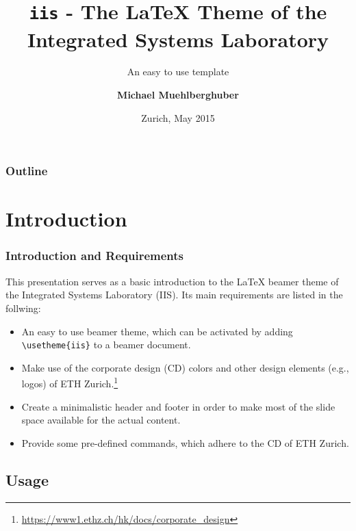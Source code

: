 \documentclass{beamer}
\title{\textbf{\texttt{iis}} - The \LaTeX{} \latexcls{beamer} Theme of the Integrated Systems Laboratory}
\subtitle{An easy to use template}
\date{Zurich, May 2015}
\author[%
  M. Muehlberghuber%
]{%
  \textbf{Michael Muehlberghuber}%
}
\institute[%
  IIS%
]{Integrated Systems Laboratory}
\newcommand\latexcls[1]{\textsf{#1}}
\begin{document}
\begin{frame}
\titlepage
\end{frame}

\begin{frame}
\frametitle{Outline}
\tableofcontents
\end{frame}

\section{Introduction}

\begin{frame}[%
  fragile %
]
\frametitle{Introduction and Requirements}
%
This presentation serves as a basic introduction to the \LaTeX{}
\latexcls{beamer} theme of the Integrated Systems Laboratory
(IIS). Its main requirements are listed in the follwing: \vfill
%
  \begin{itemize}
  \item An easy to use \latexcls{beamer} theme, which can be activated
    by adding \lstinline[style=latexcodestyle]!\usetheme{iis}! to a
    \latexcls{beamer} document. \vfill
  \item Make use of the corporate design (CD) colors and other design
    elements (e.g., logos) of ETH
    Zurich.\footnote{\url{https://www1.ethz.ch/hk/docs/corporate_design}}
    \vfill
  \item Create a minimalistic header and footer in order to make most of
    the slide space available for the actual content. \vfill
  \item Provide some pre-defined commands, which adhere to the CD of
    ETH Zurich.
  \end{itemize}
\end{frame}

\subsection{Usage}
\end{document}
